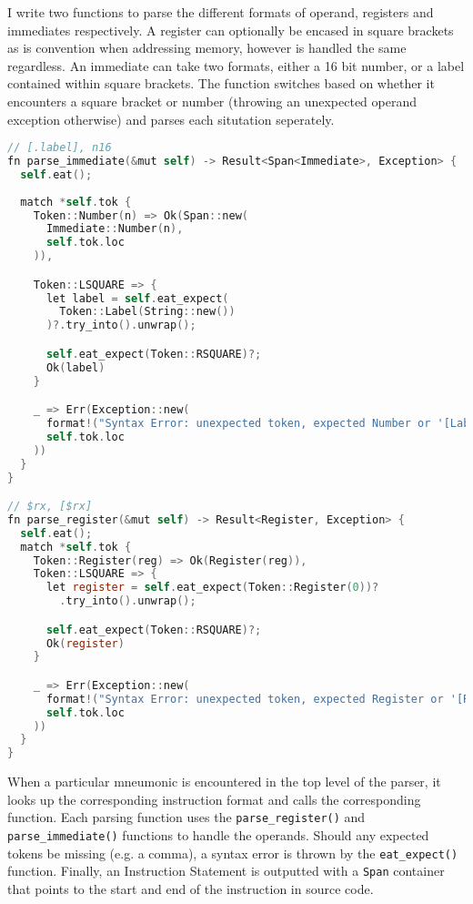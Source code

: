 I write two functions to parse the different formats of operand, registers and immediates respectively. A register can optionally be encased in square brackets as is convention when addressing memory, however is handled the same regardless. An immediate can take two formats, either a 16 bit number, or a label contained within square brackets. The function switches based on whether it encounters a square bracket or number (throwing an unexpected operand exception otherwise) and parses each situtation seperately.

\begin{lstlisting}[language=C]
// [.label], n16
fn parse_immediate(&mut self) -> Result<Span<Immediate>, Exception> {
  self.eat();
  
  match *self.tok {
    Token::Number(n) => Ok(Span::new(
      Immediate::Number(n), 
      self.tok.loc
    )),

    Token::LSQUARE => {
      let label = self.eat_expect(
        Token::Label(String::new())
      )?.try_into().unwrap();

      self.eat_expect(Token::RSQUARE)?;
      Ok(label)
    }

    _ => Err(Exception::new(
      format!("Syntax Error: unexpected token, expected Number or '[Label]', got: '{:?}'", *self.tok),
      self.tok.loc
    ))
  }
}

// $rx, [$rx]
fn parse_register(&mut self) -> Result<Register, Exception> {
  self.eat();
  match *self.tok {
    Token::Register(reg) => Ok(Register(reg)),
    Token::LSQUARE => {
      let register = self.eat_expect(Token::Register(0))?
        .try_into().unwrap();

      self.eat_expect(Token::RSQUARE)?;
      Ok(register)
    }

    _ => Err(Exception::new(
      format!("Syntax Error: unexpected token, expected Register or '[Register]', got: '{:?}'", *self.tok),
      self.tok.loc
    ))
  }
} 
\end{lstlisting}

When a particular mneumonic is encountered in the top level of the parser, it looks up the corresponding instruction format and calls the corresponding function. Each parsing function uses the \texttt{parse\_register()} and \texttt{parse\_immediate()} functions to handle the operands. Should any expected tokens be missing (e.g. a comma), a syntax error is thrown by the \texttt{eat\_expect()} function. Finally, an Instruction Statement is outputted with a \texttt{Span} container that points to the start and end of the instruction in source code.

